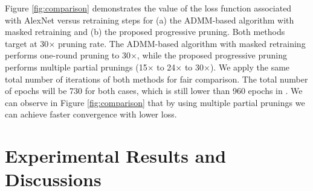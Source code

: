 \documentclass{article} %
\begin{document}
Figure \ref{fig:comparison} demonstrates the value of the loss function associated with AlexNet versus retraining steps for (a) the ADMM-based algorithm with masked retraining and (b) the proposed progressive pruning. Both methods target at 30$\times$ pruning rate. The ADMM-based algorithm with masked retraining performs one-round pruning to 30$\times$, while the proposed progressive pruning performs multiple partial prunings (15$\times$ to 24$\times$ to 30$\times$). We apply the same total number of iterations of both methods for fair comparison. The total number of epochs will be 730 for both cases, which is still lower than 960 epochs in \citep{han2015deep}. We can observe in Figure \ref{fig:comparison} that by using multiple partial prunings we can achieve faster convergence with lower loss. 

























































\section{Experimental Results and Discussions}
\end{document}
